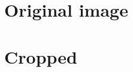 \documentclass[11pt]{article}
\newcommand{\figdir}{figs/}
\newcommand{\fig}{\figdir/test.eps}
\begin{document}
\doublespacing
\MOONSTITLE

\section{Original image}

\section{Cropped}

\end{document}
